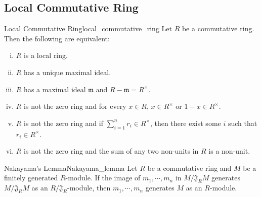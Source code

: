 \subsection{Local Commutative Ring}

\begin{definition}{Local Commutative Ring}{local_commutative_ring}
    Let $R$ be a commutative ring. Then the following are equivalent:
    \begin{enumerate}[(i)]
        \item $R$ is a local ring.
        \item $R$ has a unique maximal ideal.
        \item $R$ has a maximal ideal $\mathfrak{m}$ and $R - \mathfrak{m}= R^{\times}$.
        \item $R$ is not the zero ring and for every $x \in R$, $x\in R^{\times}$ or $1-x\in R^{\times}$.
        \item $R$ is not the zero ring and if $\sum_{i=1}^n r_i\in R^{\times}$, then there exist some $i$ such that $r_i\in R^{\times}$. 
        \item $R$ is not the zero ring and the sum of any two non-units in $R$ is a non-unit.
    \end{enumerate}
\end{definition}

\begin{lemma}{Nakayama's Lemma}{Nakayama_lemma}
    Let $R$ be a commutative ring and $M$ be a finitely generated $R$-module. If the image of $m_1,\cdots,m_n$ in $M/\mathfrak{J}_R M$ generates $M/\mathfrak{J}_R M$ as an $R/\mathfrak{J}_R$-module, then $m_1,\cdots,m_n$ generates $M$ as an $R$-module.
    
\end{lemma}

